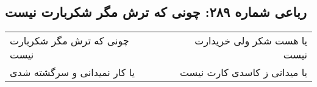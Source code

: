 \begin{center}
\section*{رباعی شماره ۲۸۹: چونی که ترش مگر شکربارت نیست}
\label{sec:0289}
\begin{longtable}{l p{0.5cm} r}
چونی که ترش مگر شکربارت نیست
&&
یا هست شکر ولی خریدارت نیست
\\
یا کار نمیدانی و سرگشته شدی
&&
یا میدانی ز کاسدی کارت نیست
\\
\end{longtable}
\end{center}
